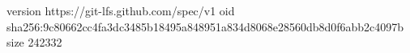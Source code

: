 version https://git-lfs.github.com/spec/v1
oid sha256:9c80662cc4fa3dc3485b18495a848951a834d8068e28560db8d0f6abb2c4097b
size 242332
